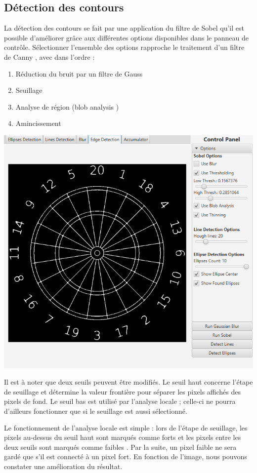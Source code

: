 \documentclass[a4paper, 11pt]{article}
\begin{document}
\begin{multicols}{2}
\section{Détection des contours}
\par
La détection des contours se fait par une application du filtre de Sobel qu'il est possible d'améliorer grâce aux différentes options disponibles dans le panneau de contrôle. Sélectionner l'ensemble des options rapproche le traitement d'un filtre de Canny \cite{wiki_canny}, avec dans l'ordre :
\begin{enumerate}
\item Réduction du bruit par un filtre de Gauss
\item Seuillage
\item Analyse de région (\og blob analysis \fg{})
\item Amincissement
\end{enumerate}
\begin{center}
\centering
\includegraphics[width=0.9\linewidth]{img/front_edges_00.png}
\vspace{-2mm}
\label{fig:frontEdges00}
\end{center}
\par
Il est à noter que deux seuils peuvent être modifiés. Le seuil haut concerne l'étape de seuillage et détermine la valeur frontière pour séparer les pixels affichés des pixels de fond. Le seuil bas est utilisé par l'analyse locale ; celle-ci ne pourra d'ailleurs fonctionner que si le seuillage est aussi sélectionné.
\par
Le fonctionnement de l'analyse locale est simple : lors de l'étape de seuillage, les pixels au-dessus du seuil haut sont marqués comme \og forts \fg{} et les pixels entre les deux seuils sont marqués comme \og faibles \fg{}. Par la suite, un pixel faible ne sera gardé que s'il est connecté à un pixel fort. En fonction de l'image, nous pouvons constater une amélioration du résultat.


\end{multicols}
\end{document}
